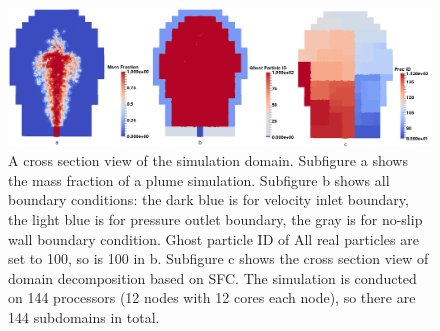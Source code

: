\documentclass[journal abbreviation, manuscript]{copernicus}
\begin{document}
\begin{figure}
\includegraphics[width=18cm]{t120_bc_proc.png}
\caption{A cross section view of the simulation domain. Subfigure a shows the mass fraction of a plume simulation. Subfigure b shows all boundary conditions: the dark blue is for velocity inlet boundary, the light blue is for pressure outlet boundary, the gray is for no-slip wall boundary condition. Ghost particle ID of All real particles are set to 100, so is 100 in b. Subfigure c shows the cross section view of domain decomposition based on SFC. The simulation is conducted on 144 processors (12 nodes with 12 cores each node), so there are 144 subdomains in total.}
\label{fig:bc_and_domain_decomp}
\end{figure}
\end{document}
